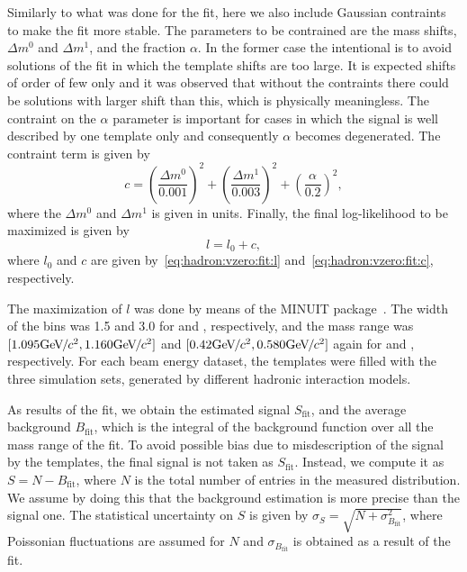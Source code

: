 Similarly to what was done for the \dedx fit,
here we also include Gaussian contraints to make the
fit more stable. The parameters to be contrained are
the mass shifts, $\Delta m^0$ and $\Delta m^1$, and the fraction
$\alpha$. In the former case the intentional is to avoid
solutions of the fit in which the template shifts are too large.
It is expected shifts of order of few \MeVc only and it was observed
that without the contraints there could be solutions with
larger shift than this, which is physically meaningless.
The contraint on the $\alpha$ parameter is important
for cases in which the signal is well described by one
template only and consequently $\alpha$ becomes
degenerated. The contraint term is given by
\begin{equation}
  c = \left(\frac{\Delta m^0}{0.001}\right)^2+\left(\frac{\Delta m^1}{0.003}\right)^2
  +\left(\frac{\alpha}{0.2}\right)^2,
  \label{eq:hadron:vzero:fit:c}
\end{equation}
where the $\Delta m^0$ and $\Delta m^1$ is given in \GeVc units.
Finally, the final log-likelihood to be maximized is given by
\begin{equation}
  l = l_0 +c,
  \label{eq:hadron:vzero:fit:l}
\end{equation}
where $l_0$ and $c$ are given by~\cref{eq:hadron:vzero:fit:l}
and~\cref{eq:hadron:vzero:fit:c}, respectively.

The maximization of $l$ was done by means of the
MINUIT package~\cite{James:1975dr}. The width
of the \minv bins was 1.5 and 3.0 \MeVcc for
\lambs and \kzeros, respectively, and the mass range
was $[1.095 \mbox{Ge\kern-0.1em V}\kern-0.1em/\kern-0.05em c^2, 1.160 \mbox{Ge\kern-0.1em V}\kern-0.1em/\kern-0.05em c^2]$ and $[0.42 \mbox{Ge\kern-0.1em V}\kern-0.1em/\kern-0.05em c^2, 0.580 \mbox{Ge\kern-0.1em V}\kern-0.1em/\kern-0.05em c^2]$  
again for \lambs and \kzeros, respectively.
For each beam energy dataset, the templates were filled
with the three simulation sets, generated by different
hadronic interaction models.

As results of the fit, we obtain the estimated signal
$S_\text{fit}$, and the average background $B_\text{fit}$, which is the integral
of the background function over all the mass range of the fit.
To avoid possible bias due to misdescription of the signal
by the templates, the final signal is not taken as $S_\text{fit}$.
Instead, we compute it as $S = N - B_\text{fit}$,
where $N$ is the total number of entries in the measured \minv distribution.
We assume by doing this that the background estimation is more precise
than the signal one.
The statistical uncertainty on $S$ is given by $\sigma_S = \sqrt{N+\sigma_{B_\text{fit}}^2}$,
where Poissonian fluctuations are assumed for $N$ and $\sigma_{B_\text{fit}}$
is obtained as a result of the fit.

